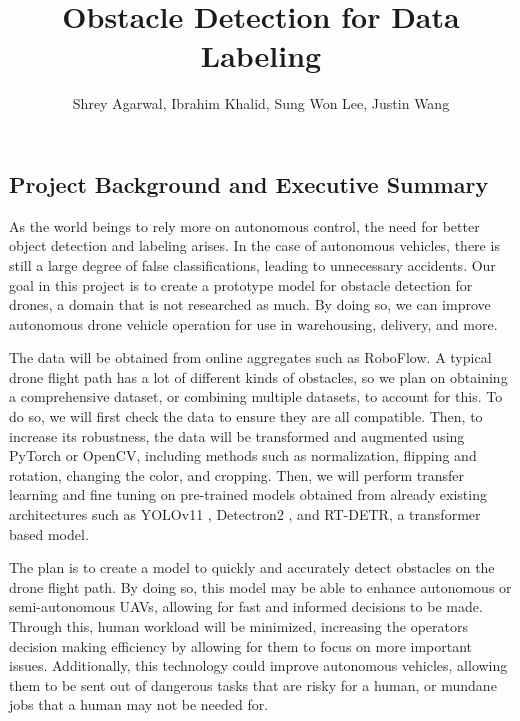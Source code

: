 \documentclass[stu,12pt,floatsintext]{apa7}
\title{Obstacle Detection for Data Labeling}
\author{Shrey Agarwal, Ibrahim Khalid, Sung Won Lee, Justin Wang}
\begin{document}
\maketitle

\subsection{Project Background and Executive Summary}
As the world beings to rely more on autonomous control, the need for better object detection and labeling arises. In the case of autonomous vehicles, there is still a large degree of false classifications, leading to unnecessary accidents. Our goal in this project is to create a prototype model for obstacle detection for drones, a domain that is not researched as much. By doing so, we can improve autonomous drone vehicle operation for use in warehousing, delivery, and more.

The data will be obtained from online aggregates such as RoboFlow. A typical drone flight path has a lot of different kinds of obstacles, so we plan on obtaining a comprehensive dataset, or combining multiple datasets, to account for this. To do so, we will first check the data to ensure they are all compatible. Then, to increase its robustness, the data will be transformed and augmented using PyTorch or OpenCV, including methods such as normalization, flipping and rotation, changing the color, and cropping. Then, we will perform transfer learning and fine tuning on pre-trained models obtained from already existing architectures such as YOLOv11 \parencite{yolo11_ultralytics}, Detectron2 \parencite{wu2019detectron2}, and RT-DETR\parencite{zhao_detrs_2024}, a transformer based model.

The plan is to create a model to quickly and accurately detect obstacles on the drone flight path. By doing so, this model may be able to enhance autonomous or semi-autonomous UAVs, allowing for fast and informed decisions to be made. Through this, human workload will be minimized, increasing the operators decision making efficiency by allowing for them to focus on more important issues. Additionally, this technology could improve autonomous vehicles, allowing them to be sent out of dangerous tasks that are risky for a human, or mundane jobs that a human may not be needed for.
\end{document}
